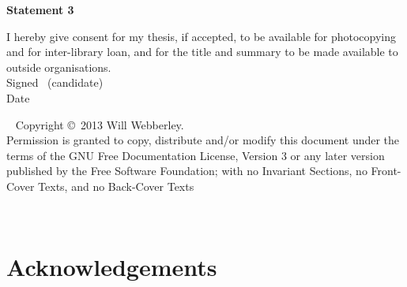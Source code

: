 \vfill

\textbf{\large Statement 3}

I hereby give consent for my thesis, if accepted, to be available for photocopying and for inter-library loan,
 and for the title and summary to be made available to outside organisations.\\[2ex]
Signed \dotfill \ (candidate) \hspace*{10em}\\[1ex]
Date\ \ \ \ \ \dotfill \hspace*{18em}

\vfill

\cleardoublepage


\thispagestyle{plain}
\ \vfill{\small
Copyright \copyright\ 2013 Will Webberley.\\
Permission is granted to copy, distribute and/or modify this document
under the terms of the GNU Free Documentation License, Version 3 or
any later version published by the Free Software Foundation; with no
Invariant Sections, no Front-Cover Texts, and no Back-Cover Texts}\\[3.5ex]
\cleardoublepage


\ \vspace*{1.11cm}
\begin{flushright}
\end{flushright}
\newpage
\markboth{}{}
\cleardoublepage

\chapter*{Acknowledgements}


